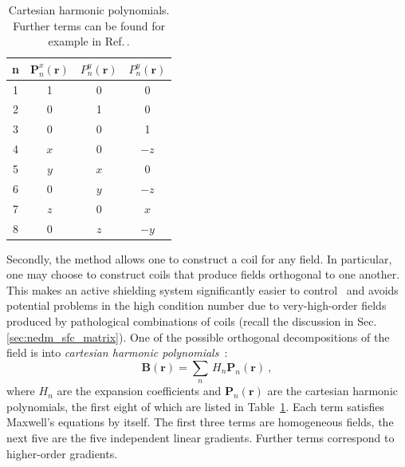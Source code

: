 \begin{table}
  \centering
  \begin{tabular}{c|ccc}
    n & $\mathbf{P}_n^x(\mathbf{r})$ & $P_n^y(\mathbf{r})$ & $P_n^y(\mathbf{r})$ \\ \midrule
    1 & 1 & 0 & 0 \\
    2 & 0 & 1 & 0 \\
    3 & 0 & 0 & 1 \\
    \midrule
    4 & $x$ &  0  & $-z$ \\
    5 & $y$ & $x$ &   0  \\
    6 &  0  & $y$ & $-z$ \\
    7 & $z$ &  0  & $ x$ \\
    8 &  0  & $z$ & $-y$ \\
  \end{tabular}
  \caption{Cartesian harmonic polynomials. Further terms can be found for example in Ref.\,\cite{Franke2013}.}\label{tab:coils_cartesian_harmonics}
\end{table}

Secondly, the method allows one to construct a coil for any field.
In particular, one may choose to construct coils that produce fields orthogonal to one another. 
This makes an active shielding system significantly easier to control~\cite{MRM:MRM1910010107} and avoids potential problems in the high condition number due to very-high-order fields produced by pathological combinations of coils (recall the discussion in Sec.\,\ref{sec:nedm_sfc_matrix}).
One of the possible orthogonal decompositions of the field is into \emph{cartesian harmonic polynomials}~\cite{Franke2013}:
\begin{equation}
  \mathbf{B}(\mathbf{r}) = \sum_{n}\,H_n \mathbf{P}_n(\mathbf{r}) \ ,
\end{equation}
where $H_n$ are the expansion coefficients and $\mathbf{P}_n(\mathbf{r})$ are the cartesian harmonic polynomials, the first eight of which are listed in Table~\ref{tab:coils_cartesian_harmonics}.
Each term satisfies Maxwell's equations by itself.
The first three terms are homogeneous fields, the next five are the five independent linear gradients.
Further terms correspond to higher-order gradients.

